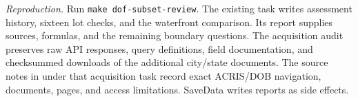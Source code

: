 \small
\textit{Reproduction.} Run \texttt{make dof-subset-review}. The existing
 task writes assessment
history, sixteen lot checks, and the waterfront comparison. Its report
 supplies sources, formulas, and the
remaining boundary questions. The acquisition audit preserves raw API
responses, query definitions, field documentation, and checksummed downloads
of the additional city/state documents. The source notes in
 under
that acquisition task record exact ACRIS/DOB navigation, documents, pages,
and access limitations. SaveData writes reports as side effects.
\normalsize
